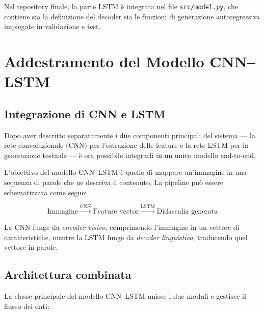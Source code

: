 \documentclass[11pt,a4paper]{report}
\begin{document}
\begin{tcolorbox}[title=Riferimento al codice]
Nel repository finale, la parte LSTM è integrata nel file \texttt{src/model.py}, che contiene sia la definizione del decoder sia le funzioni di generazione autoregressiva impiegate in validazione e test.
\end{tcolorbox}

\chapter{Addestramento del Modello CNN--LSTM}

\section{Integrazione di CNN e LSTM}

Dopo aver descritto separatamente i due componenti principali del sistema — la rete convoluzionale (CNN) per l’estrazione delle feature e la rete LSTM per la generazione testuale — è ora possibile integrarli in un unico modello end-to-end.

L’obiettivo del modello CNN–LSTM è quello di mappare un’immagine in una sequenza di parole che ne descriva il contenuto.  
La pipeline può essere schematizzata come segue:

\[
\text{Immagine} \xrightarrow{\text{CNN}} \text{Feature vector} \xrightarrow{\text{LSTM}} \text{Didascalia generata}
\]

\begin{tcolorbox}[title=Idea chiave]
La CNN funge da \emph{encoder visivo}, comprimendo l’immagine in un vettore di caratteristiche, mentre la LSTM funge da \emph{decoder linguistico}, traducendo quel vettore in parole.
\end{tcolorbox}

\section{Architettura combinata}

La classe principale del modello CNN–LSTM unisce i due moduli e gestisce il flusso dei dati:
\end{document}

